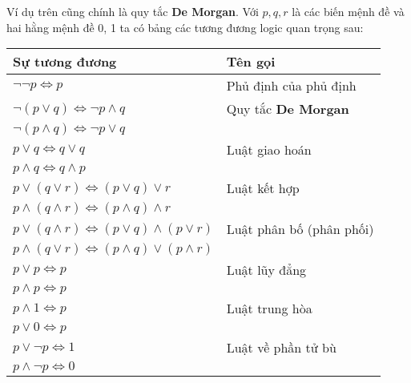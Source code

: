 \documentclass{standalone} %
\begin{document}
        Ví dụ trên cũng chính là quy tắc \textbf{De Morgan}. Với $p, q, r$ là các biến mệnh đề và hai hằng mệnh đề 0, 1 ta có bảng các tương đương logic quan trọng sau:
        
        \begin{table}[h!] 
            \centering
            \setlength{\tabcolsep}{18pt}
            \begin{tabular}{l |l}
                Sự tương đương & Tên gọi\\ \hline
                
                $\neg \neg p \Leftrightarrow p$ & Phủ định của phủ định\\ \hline
                
                $\neg (p \lor q) \Leftrightarrow \neg p \land q$ & Quy tắc \textbf{De Morgan}\\
                $\neg (p \land q) \Leftrightarrow \neg p \lor q$ & \\ \hline
                
                $p \lor q \Leftrightarrow q \lor q$ & Luật giao hoán\\
                $p \land q \Leftrightarrow q \land p$ & \\ \hline
                
                $p \lor (q \lor r) \Leftrightarrow (p \lor q) \lor r$ & Luật kết hợp\\ 
                $p \land (q \land r) \Leftrightarrow (p \land q) \land r$ & \\ \hline
                
                $p \lor (q \land r)  \Leftrightarrow (p \lor q) \land (p \lor r)$ & Luật phân bố (phân phối)\\
                $p \land (q \lor r) \Leftrightarrow (p \land q) \lor (p \land r)$ & \\ \hline
                
                $p \lor p \Leftrightarrow p$ & Luật lũy đẳng\\
                $p \land p \Leftrightarrow p$\\ \hline
                
                $p \land 1 \Leftrightarrow p$ & Luật trung hòa\\
                $p \lor 0 \Leftrightarrow p$ & \\ \hline
                
                $p \lor \neg p \Leftrightarrow 1$ & Luật về phần tử bù\\
                $p \land \neg p \Leftrightarrow 0$ & \\ \hline
                

\end{tabular}
\end{table}
\end{document}
